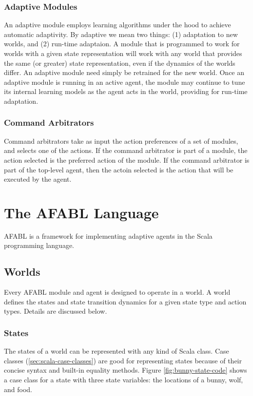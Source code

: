 \subsubsection{Adaptive Modules}

An adaptive module employs learning algorithms under the hood to achieve automatic adaptivity.  By adaptive we mean two things: (1) adaptation to new worlds, and (2) run-time adaptaion.  A module that is programmed to work for worlds with a given state representation will work with any world that provides the same (or greater) state representation, even if the dynamics of the worlds differ.  An adaptive module need simply be retrained for the new world.  Once an adaptive module is running in an active agent, the module may continue to tune its internal learning models as the agent acts in the world, providing for run-time adaptation.

\subsubsection{Command Arbitrators}

Command arbitrators take as input the action preferences of a set of modules, and selects one of the actions.  If the command arbitrator is part of a module, the action selected is the preferred action of the module.  If the command arbitrator is part of the top-level agent, then the actoin selected is the action that will be executed by the agent.

\section{The AFABL Language}

AFABL is a framework for implementing adaptive agents in the Scala programming language.

\subsection{Worlds}

Every AFABL module and agent is designed to operate in a world. A world defines the states and state transition dynamics for a given state type and action types. Details are discussed below.

\subsubsection{States}

The states of a world can be represented with any kind of Scala class. Case classes (\ref{sec:scala-case-classes}) are good for representing states because of their concise syntax and built-in equality methods. Figure \ref{fig:bunny-state-code} shows a case class for a state with three state variables: the locations of a bunny, wolf, and food.

